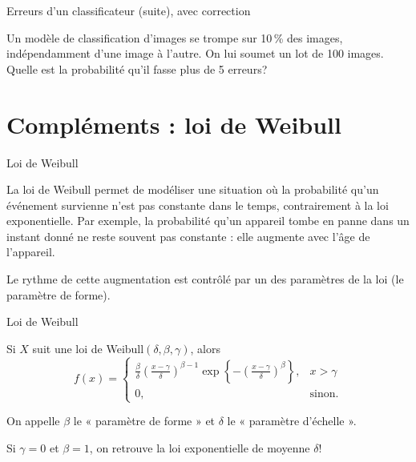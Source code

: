 \documentclass{BeamerTemplate}
\newcommand{\cibleReponse}{}
\newcommand{\lienreponse}[1]{\gdef\cibleReponse{#1}}
\begin{document}
\begin{frame}[t]{Erreurs d'un classificateur (suite), avec correction}

Un modèle de classification d'images se trompe sur 10\,\% des images, indépendamment d'une
image à l'autre. On lui soumet un lot de 100 images. Quelle est la probabilité qu'il fasse plus
de 5 erreurs?

\lienreponse{rep-ex3}
\end{frame}

\section{Compléments : loi de Weibull}

\begin{frame}[t]{Loi de Weibull}

La loi de Weibull permet de modéliser une situation où la probabilité qu'un événement survienne
n'est pas constante dans le temps, contrairement à la loi exponentielle. Par exemple, la
probabilité qu'un appareil tombe en panne dans un instant donné ne reste souvent pas constante :
elle augmente avec l'âge de l'appareil.

\vspace{0.2in}
Le rythme de cette augmentation est contrôlé par un des paramètres de la loi (le paramètre de forme).

\end{frame}


\begin{frame}{Loi de Weibull}

Si $X$ suit une loi de Weibull$(\delta,\beta,\gamma)$, alors
$$f(x)=\left\{\begin{array}{ll}
\frac{\beta}{\delta}\left(\frac{x-\gamma}{\delta}\right)^{\beta-1}
\exp\left\{-\left(\frac{x-\gamma}{\delta}\right)^\beta\right\}, & x>\gamma\\
0, & \text{sinon}.\end{array}\right.$$

\vspace{0.2in}
On appelle $\beta$ le « paramètre de forme » et $\delta$ le « paramètre d'échelle ».

\vspace{0.4in}
Si $\gamma=0$ et $\beta=1$, on retrouve la loi exponentielle de moyenne $\delta$!

\end{frame}
\end{document}
